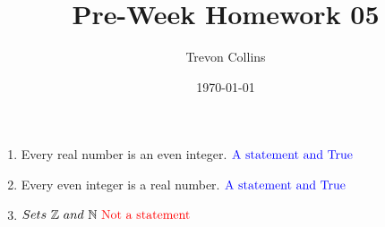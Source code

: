 \documentclass{article}
\title{Pre-Week Homework 05}
\author{Trevon Collins}
\date{\today}
\begin{document}
\maketitle

\setcounter{section}{2}
\subsection{}
\begin{enumerate}
    \item Every real number is an even integer. $\textcolor{blue}{\text{A statement and True}}$
    \item Every even integer is a real number. $\textcolor{blue}{\text{A statement and True}}$
    \setcounter{enumi}{3}
    \item $Sets \ \mathbb{Z} \ and \ \mathbb{N} \ \textcolor{red}{\text{Not a statement}}$
\end{enumerate}

\setcounter{subsection}{4}
\end{document}
